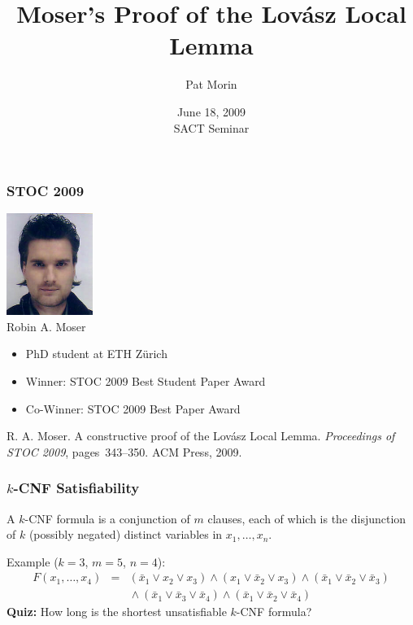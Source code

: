 \documentclass{beamer}
\title{Moser's Proof of the Lov\'asz Local Lemma}
\author{Pat Morin}
\date{June 18, 2009 \\ SACT Seminar}
\begin{document}
\frame{\titlepage}

\frame
{
  \frametitle{STOC 2009}

  \begin{center}
    \includegraphics[height=1.3in]{moser} \\
    Robin A. Moser
  \end{center}
  \begin{itemize}
    \item PhD student at ETH Z\"urich
    \item Winner: STOC 2009 Best Student Paper Award
    \item Co-Winner: STOC 2009 Best Paper Award
  \end{itemize}
  R. A. Moser. A constructive proof of the Lov\'asz Local Lemma.
  \emph{Proceedings of STOC 2009}, pages~343--350. ACM Press, 2009. 
} 



\frame
{
  \frametitle{$k$-CNF Satisfiability}
  
  \begin{dfn}
    A $k$-CNF formula is a conjunction of $m$ clauses, each of which is the
    disjunction of $k$ (possibly negated) distinct variables in 
    $x_1,\ldots,x_n$.
  \end{dfn}

  Example ($k=3$, $m=5$, $n=4$): 
  \begin{eqnarray*}
   F(x_1,\ldots,x_4) & = &
   (\bar x_1 \vee x_2 \vee x_3) 
   \wedge (x_1 \vee \bar x_2  \vee x_3) 
   \wedge (\bar x_1 \vee \bar x_2 \vee \bar x_3) \\
   & & {}\wedge (\bar x_1 \vee \bar x_3 \vee \bar x_4)
   \wedge (\bar x_1 \vee \bar x_2 \vee \bar x_4)
  \end{eqnarray*}
  \textbf{Quiz:} How long is the shortest unsatisfiable $k$-CNF formula?
}
\end{document}
